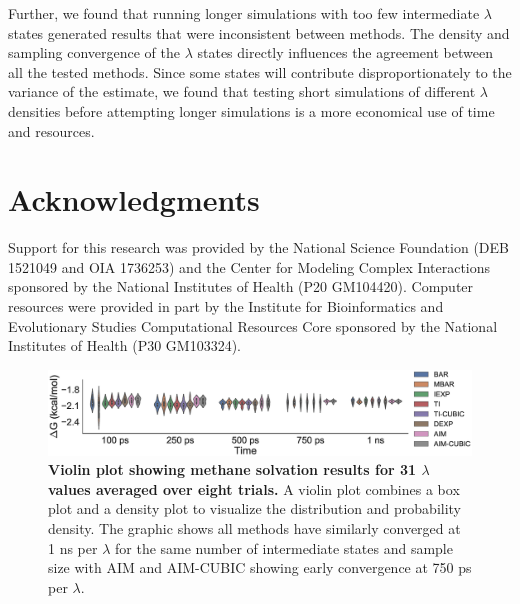 \documentclass[fleqn,10pt,lineno]{wlpeerj} %
\begin{document}
Further, we found that running longer simulations with too few intermediate $\lambda$ states generated results that were inconsistent between methods. The density and sampling convergence of the $\lambda$ states directly influences the agreement between all the tested methods. Since some states will contribute disproportionately to the variance of the estimate, we found that testing short simulations of different $\lambda$ densities before attempting longer simulations is a more economical use of time and resources.

\section*{Acknowledgments}
Support for this research was provided by the National Science Foundation (DEB 1521049 and OIA 1736253) and the Center for Modeling Complex Interactions sponsored by the National Institutes of Health (P20 GM104420). Computer resources were provided in part by the Institute for Bioinformatics and Evolutionary Studies Computational Resources Core sponsored by the National Institutes of Health (P30 GM103324).



\pagebreak

\begin{figure}
    \centering
    \includegraphics[width=1\textwidth]{Figure_1_Methane_31L_violinplotovertime.eps}
    \caption{\textbf{Violin plot showing methane solvation results for 31 $\lambda$ values averaged over eight trials.} A violin plot combines a box plot and a density plot to visualize the distribution and probability density. The graphic shows all methods have similarly converged at 1 ns per $\lambda$ for the same number of intermediate states and sample size with AIM and AIM-CUBIC showing early convergence at 750 ps per $\lambda$.}
    \label{methane31}
\end{figure}

\pagebreak
\end{document}
